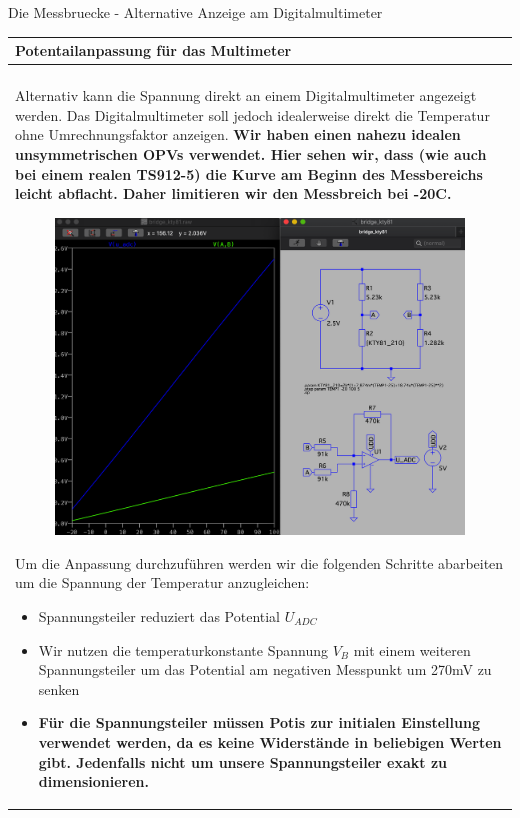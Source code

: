 \begin{frame}[t]{Die Messbruecke - Alternative Anzeige am Digitalmultimeter} 
    
    \begin{spacing}{0.9} \begin{tiny}
      \begin{table}[h!]
      \begin{tabular}{p{10cm} }
        \hline
        \textbf{Potentailanpassung für das Multimeter} \\
        \hline \\
        \begin{minipage}{\textwidth}
           Alternativ kann die Spannung direkt an einem Digitalmultimeter angezeigt werden. \newline
           Das Digitalmultimeter soll jedoch idealerweise direkt die Temperatur ohne Umrechnungsfaktor anzeigen.
           \textbf{Wir haben einen nahezu idealen unsymmetrischen OPVs verwendet. Hier sehen wir, dass (wie auch bei einem realen TS912-5) die Kurve am Beginn des Messbereichs leicht abflacht. Daher limitieren wir den Messbreich bei -20C.}
           \begin{figure}
               \centering
               \includegraphics[width=0.4\linewidth]{pictures/digimul_ready.png}
           \end{figure}
           Um die Anpassung durchzuführen werden wir die folgenden Schritte abarbeiten um die Spannung der Temperatur anzugleichen:
           \begin{itemize}
               \item Spannungsteiler reduziert das Potential $U_{ADC}$
               \item Wir nutzen die temperaturkonstante Spannung $V_B$ mit einem weiteren Spannungsteiler um das Potential am negativen Messpunkt um 270mV zu senken
               \item \textbf{Für die Spannungsteiler müssen Potis zur initialen Einstellung verwendet werden, da es keine Widerstände in beliebigen Werten gibt. Jedenfalls nicht um unsere Spannungsteiler exakt zu dimensionieren.}
           \end{itemize}
        \end{minipage} 
    \end{tabular}

    \end{table}
     
    \end{tiny} \end{spacing}

\end{frame}

